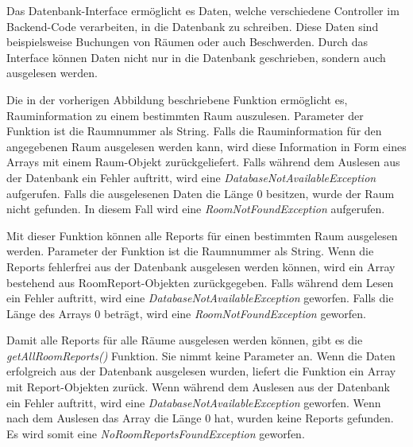 

Das Datenbank-Interface ermöglicht es Daten, welche verschiedene Controller im Back\-end-Code verarbeiten, in die Datenbank zu schreiben. Diese Daten sind beispielsweise Buchungen von Räumen oder auch Beschwerden. Durch das Interface können Daten nicht nur in die Datenbank geschrieben, sondern auch ausgelesen werden.



Die in der vorherigen Abbildung beschriebene Funktion ermöglicht es, Rauminformation zu einem bestimmten Raum auszulesen. Parameter der Funktion ist die Raumnummer als String. Falls die Rauminformation für den angegebenen Raum ausgelesen werden kann, wird diese Information in Form eines Arrays mit einem Raum-Objekt zurückgeliefert. Falls während dem Auslesen aus der Datenbank ein Fehler auftritt, wird eine \emph{DatabaseNotAvailableException} aufgerufen. Falls die ausgelesenen Daten die Länge 0 besitzen, wurde der Raum nicht gefunden. In diesem Fall wird eine \emph{RoomNotFoundException} aufgerufen.



Mit dieser Funktion können alle Reports für einen bestimmten Raum ausgelesen werden. Parameter der Funktion ist die Raumnummer als String. Wenn die Reports fehlerfrei aus der Datenbank ausgelesen werden können, wird ein Array bestehend aus RoomReport-Objekten zurückgegeben. Falls während dem Lesen ein Fehler auftritt, wird eine \emph{DatabaseNotAvailableException} geworfen. Falls die Länge des Arrays 0 beträgt, wird eine \emph{RoomNotFoundException} geworfen.


Damit alle Reports für alle Räume ausgelesen werden können, gibt es die \emph{getAllRoomReports()} Funktion. Sie nimmt keine Parameter an. Wenn die Daten erfolgreich aus der Datenbank ausgelesen wurden, liefert die Funktion ein Array mit Report-Objekten zurück. Wenn während dem Auslesen aus der Datenbank ein Fehler auftritt, wird eine \emph{DatabaseNotAvailableException} geworfen. Wenn nach dem Auslesen das Array die Länge 0 hat, wurden keine Reports gefunden. Es wird somit eine \emph{NoRoomReportsFoundException} geworfen.

